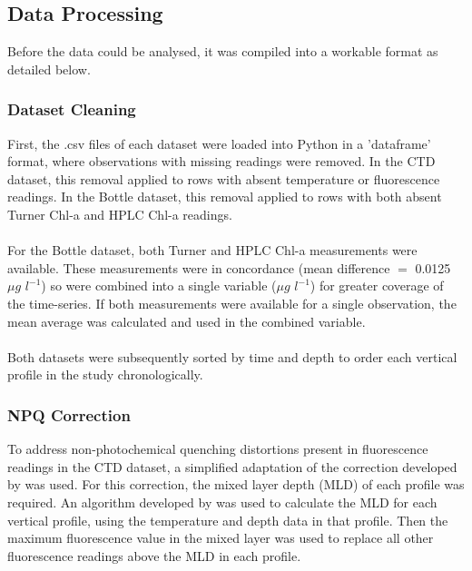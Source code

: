 \documentclass{article}
\begin{document}
\subsection{Data Processing}
Before the data could be analysed, it was compiled into a workable format as detailed below.
\subsubsection{Dataset Cleaning}
First, the .csv files of each dataset were loaded into Python in a 'dataframe' format, where observations with missing readings were removed. In the CTD dataset, this removal applied to rows with absent temperature or fluorescence readings. In the Bottle dataset, this removal applied to rows with both absent Turner Chl-a and HPLC Chl-a readings.\\ \\
\noindent
For the Bottle dataset, both Turner and HPLC Chl-a measurements were available. These measurements were in concordance (mean difference $=$ 0.0125 $\mu g$ $l ^{-1}$) so were combined into a single variable ($\mu g$ $l ^{-1}$) for greater coverage of the time-series. If both measurements were available for a single observation, the mean average was calculated and used in the combined variable.\\ \\
\noindent
Both datasets were subsequently sorted by time and depth to order each vertical profile in the study chronologically. 
\subsubsection{NPQ Correction}
To address non-photochemical quenching distortions present in fluorescence readings in the CTD dataset, a simplified adaptation of the correction developed by \cite{xing_improved_2018} was used. For this correction, the mixed layer depth (MLD) of each profile was required. An algorithm developed by \cite{holte_new_2009} was used to calculate the MLD for each vertical profile, using the temperature and depth data in that profile. Then the maximum fluorescence value in the mixed layer was used to replace all other fluorescence readings above the MLD in each profile.
\end{document}
